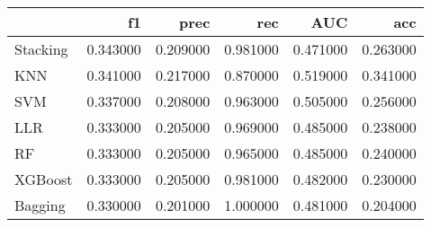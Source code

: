 \begin{tabular}{lrrrrr}
\toprule
 & f1 & prec & rec & AUC & acc \\
\midrule
Stacking & 0.343000 & 0.209000 & 0.981000 & 0.471000 & 0.263000 \\
KNN & 0.341000 & 0.217000 & 0.870000 & 0.519000 & 0.341000 \\
SVM & 0.337000 & 0.208000 & 0.963000 & 0.505000 & 0.256000 \\
LLR & 0.333000 & 0.205000 & 0.969000 & 0.485000 & 0.238000 \\
RF & 0.333000 & 0.205000 & 0.965000 & 0.485000 & 0.240000 \\
XGBoost & 0.333000 & 0.205000 & 0.981000 & 0.482000 & 0.230000 \\
Bagging & 0.330000 & 0.201000 & 1.000000 & 0.481000 & 0.204000 \\
\bottomrule
\end{tabular}
